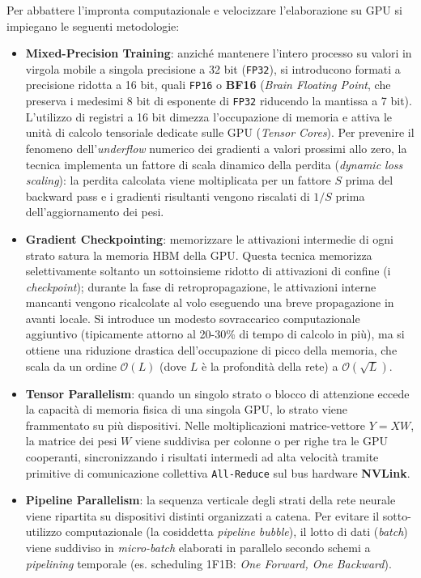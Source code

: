 \documentclass[11pt, a4paper]{article}
\begin{document}
Per abbattere l'impronta computazionale e velocizzare l'elaborazione su GPU si impiegano le seguenti metodologie:
\begin{itemize}
    \item \textbf{Mixed-Precision Training}: anziché mantenere l'intero processo su valori in virgola mobile a singola precisione a 32 bit (\texttt{FP32}), si introducono formati a precisione ridotta a 16 bit, quali \texttt{FP16} o \textbf{BF16} (\emph{Brain Floating Point}, che preserva i medesimi 8 bit di esponente di \texttt{FP32} riducendo la mantissa a 7 bit). L'utilizzo di registri a 16 bit dimezza l'occupazione di memoria e attiva le unità di calcolo tensoriale dedicate sulle GPU (\emph{Tensor Cores}). Per prevenire il fenomeno dell'\emph{underflow} numerico dei gradienti a valori prossimi allo zero, la tecnica implementa un fattore di scala dinamico della perdita (\emph{dynamic loss scaling}): la perdita calcolata viene moltiplicata per un fattore $S$ prima del backward pass e i gradienti risultanti vengono riscalati di $1/S$ prima dell'aggiornamento dei pesi.
    \item \textbf{Gradient Checkpointing}: memorizzare le attivazioni intermedie di ogni strato satura la memoria HBM della GPU. Questa tecnica memorizza selettivamente soltanto un sottoinsieme ridotto di attivazioni di confine (i \emph{checkpoint}); durante la fase di retropropagazione, le attivazioni interne mancanti vengono ricalcolate al volo eseguendo una breve propagazione in avanti locale. Si introduce un modesto sovraccarico computazionale aggiuntivo (tipicamente attorno al 20-30\% di tempo di calcolo in più), ma si ottiene una riduzione drastica dell'occupazione di picco della memoria, che scala da un ordine $\mathcal{O}(L)$ (dove $L$ è la profondità della rete) a $\mathcal{O}(\sqrt{L})$.
    \item \textbf{Tensor Parallelism}: quando un singolo strato o blocco di attenzione eccede la capacità di memoria fisica di una singola GPU, lo strato viene frammentato su più dispositivi. Nelle moltiplicazioni matrice-vettore $Y = XW$, la matrice dei pesi $W$ viene suddivisa per colonne o per righe tra le GPU cooperanti, sincronizzando i risultati intermedi ad alta velocità tramite primitive di comunicazione collettiva \texttt{All-Reduce} sul bus hardware \textbf{NVLink}.
    \item \textbf{Pipeline Parallelism}: la sequenza verticale degli strati della rete neurale viene ripartita su dispositivi distinti organizzati a catena. Per evitare il sotto-utilizzo computazionale (la cosiddetta \emph{pipeline bubble}), il lotto di dati (\emph{batch}) viene suddiviso in \emph{micro-batch} elaborati in parallelo secondo schemi a \emph{pipelining} temporale (es. scheduling 1F1B: \emph{One Forward, One Backward}).

\end{itemize}
\end{document}
